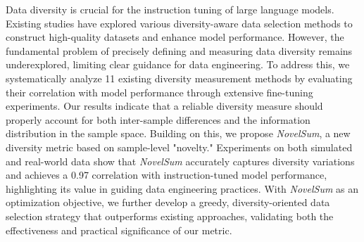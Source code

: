 Data diversity is crucial for the instruction tuning of large language models. 
Existing studies have explored various diversity-aware data selection methods to construct high-quality datasets and enhance model performance. 
However, the fundamental problem of precisely defining and measuring data diversity remains underexplored, limiting clear guidance for data engineering. 
To address this, we systematically analyze 11 existing diversity measurement methods by evaluating their correlation with model performance through extensive fine-tuning experiments. 
Our results indicate that a reliable diversity measure should properly account for both inter-sample differences and the information distribution in the sample space.
Building on this, we propose \textit{NovelSum}, a new diversity metric based on sample-level "novelty." 
Experiments on both simulated and real-world data show that \textit{NovelSum} accurately captures diversity variations and achieves a 0.97 correlation with instruction-tuned model performance, highlighting its value in guiding data engineering practices. 
With \textit{NovelSum} as an optimization objective, we further develop a greedy, diversity-oriented data selection strategy that outperforms existing approaches, validating both the effectiveness and practical significance of our metric.

